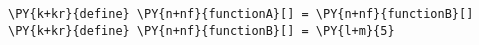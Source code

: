 \begin{Verbatim}[commandchars=\\\{\}]
\PY{k+kr}{define} \PY{n+nf}{functionA}[] = \PY{n+nf}{functionB}[]
\PY{k+kr}{define} \PY{n+nf}{functionB}[] = \PY{l+m}{5}
\end{Verbatim}
